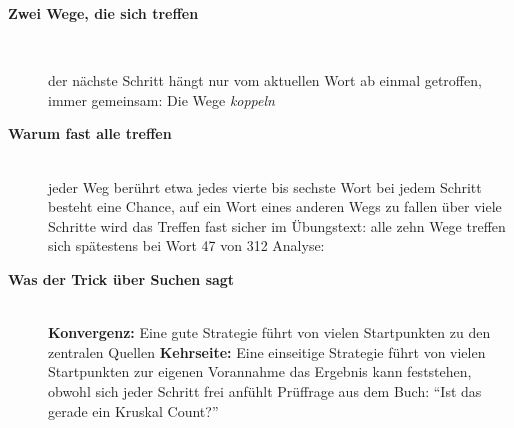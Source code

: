 \begin{description}
\item[{\rot\bf Zwei Wege, die sich treffen}]~\\[-\lblskip]
\begin{center}
\end{center}
\bi
  \ite der nächste Schritt hängt nur vom aktuellen Wort ab
  \ite einmal getroffen, immer gemeinsam: Die Wege \emph{koppeln}
\ei
\os{\newpage}

\item[{\rot\bf Warum fast alle treffen}]~\\[-\lblskip]
\bi
  \ite jeder Weg berührt etwa jedes vierte bis sechste Wort
  \ite bei jedem Schritt besteht eine Chance, auf ein Wort eines anderen
    Wegs zu fallen
  \ite über viele Schritte wird das Treffen fast sicher
  \ite im Übungstext: alle zehn Wege treffen sich spätestens bei Wort 47
    von 312
  \ite Analyse: \textcite{lagarias2009kruskal}
\ei
\os{\newpage}

\item[{\rot\bf Was der Trick über Suchen sagt}]~\\[-\lblskip]
\bi
  \ite \textbf{Konvergenz:} Eine gute Strategie führt von vielen
    Startpunkten zu den zentralen Quellen
  \ite \textbf{Kehrseite:} Eine einseitige Strategie führt von vielen
    Startpunkten zur eigenen Vorannahme
  \ite das Ergebnis kann feststehen, obwohl sich jeder Schritt frei
    anfühlt
  \ite Prüffrage aus dem Buch: \enquote{Ist das gerade ein Kruskal Count?}
\ei
{}
\os{\newpage}
\end{description}

